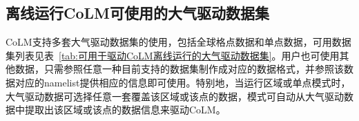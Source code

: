 \subsection{离线运行CoLM可使用的大气驱动数据集}\label{离线大气驱动数据集}
CoLM支持多套大气驱动数据集的使用，包括全球格点数据和单点数据，可用数据集列表见表~\ref{tab:可用于驱动CoLM离线运行的大气驱动数据集}。用户也可使用其他数据，只需参照任意一种目前支持的数据集制作成对应的数据格式，并参照该数据对应的namelist提供相应的信息即可使用。特别地，当运行区域或单点模式时，大气驱动数据可选择任意一套覆盖该区域或该点的数据，模式可自动从大气驱动数据中提取出该区域或该点的数据信息来驱动CoLM。


